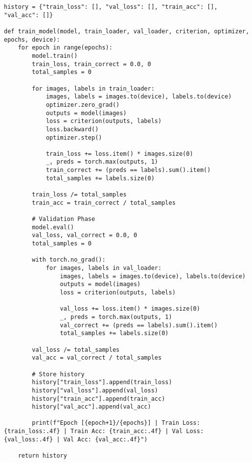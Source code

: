 \begin{verbatim}
history = {"train_loss": [], "val_loss": [], "train_acc": [], "val_acc": []}

def train_model(model, train_loader, val_loader, criterion, optimizer, epochs, device):
    for epoch in range(epochs):
        model.train()
        train_loss, train_correct = 0.0, 0
        total_samples = 0

        for images, labels in train_loader:
            images, labels = images.to(device), labels.to(device)
            optimizer.zero_grad()
            outputs = model(images)
            loss = criterion(outputs, labels)
            loss.backward()
            optimizer.step()

            train_loss += loss.item() * images.size(0)
            _, preds = torch.max(outputs, 1)
            train_correct += (preds == labels).sum().item()
            total_samples += labels.size(0)

        train_loss /= total_samples
        train_acc = train_correct / total_samples

        # Validation Phase
        model.eval()
        val_loss, val_correct = 0.0, 0
        total_samples = 0

        with torch.no_grad():
            for images, labels in val_loader:
                images, labels = images.to(device), labels.to(device)
                outputs = model(images)
                loss = criterion(outputs, labels)

                val_loss += loss.item() * images.size(0)
                _, preds = torch.max(outputs, 1)
                val_correct += (preds == labels).sum().item()
                total_samples += labels.size(0)

        val_loss /= total_samples
        val_acc = val_correct / total_samples

        # Store history
        history["train_loss"].append(train_loss)
        history["val_loss"].append(val_loss)
        history["train_acc"].append(train_acc)
        history["val_acc"].append(val_acc)

        print(f"Epoch [{epoch+1}/{epochs}] | Train Loss: {train_loss:.4f} | Train Acc: {train_acc:.4f} | Val Loss: {val_loss:.4f} | Val Acc: {val_acc:.4f}")

    return history

\end{verbatim}

